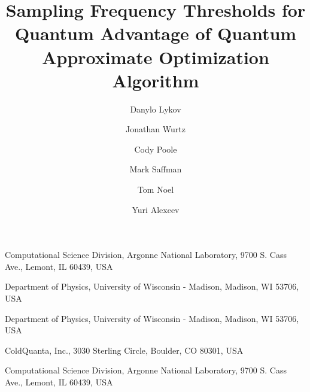 \documentclass[prb,reprint,nofootinbib,longbibliography,superscriptaddress]{revtex4-1}
\begin{document}
	\title{Sampling Frequency Thresholds for Quantum Advantage of Quantum Approximate Optimization Algorithm}

\author{Danylo Lykov}
\affiliation
{Computational Science Division, Argonne National Laboratory, 9700 S. Cass Ave., Lemont, IL 60439, USA}

\author{Jonathan Wurtz}

\author{Cody Poole}
\affiliation
{Department of Physics, University of Wisconsin - Madison, Madison, WI 53706, USA}

\author{Mark Saffman}

\affiliation
{Department of Physics, University of Wisconsin - Madison, Madison, WI 53706, USA}

\author{Tom Noel}
\affiliation
{ColdQuanta, Inc., 3030 Sterling Circle, Boulder, CO 80301, USA}


\author{Yuri Alexeev}
\affiliation
{Computational Science Division, Argonne National Laboratory, 9700 S. Cass Ave., Lemont, IL 60439, USA}


	
\end{document}
